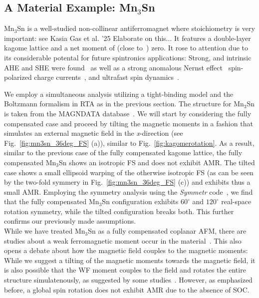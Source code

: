 \documentclass[prb,showpacs,amsmath,amssymb,superscriptaddress,twocolumn,floatfix]{revtex4-1}
\begin{document}
\subsection{A Material Example: Mn$_3$Sn}
\label{sec_I_mat}

Mn$_3$Sn is a well-studied non-collinear antiferromagnet where stoichiometry
is very important: see Kasia Gas et al. '25 %
{\color{red} Elaborate on this...}
It features 
a double-layer kagome lattice and a net moment of (close to~\cite{Tomiyashi:1982}) zero. It rose to attention due to its considerable potental for future spintronics applications: Strong, and intrinsic AHE and SHE were found~\cite{Chen:2021, Manna:2018, Nakatsuji:2015, Zhou:2020, Zhang:2017} as well as a strong anomalous Nernst effect~\cite{Chen:2021, Manna:2018, Zhou:2020} spin-polarized charge currents~\cite{Zelezny:2017}, and ultrafast spin dynamics~\cite{Chen:2021, Nakatsuji:2015}.

We employ a simultaneous analysis utilizing a tight-binding model and the Boltzmann formalism in RTA as in the previous section. The structure for Mn$_3$Sn is taken from the MAGNDATA database~\cite{Magndata:Mn3Sn}. We will start by considering the fully compensated case and proceed by tilting the magnetic moments in a fashion that simulates an external magnetic field in the \textit{x}-direction (see Fig.~\ref{fig:mn3sn_36deg_FS} (a)), similar to Fig.~\ref{fig:kagomerotation}. As a result, similar to the previous case of the fully compensated kagome lattice, the fully compensated Mn$_3$Sn shows an isotropic FS and does not exhibit AMR. The tilted case shows a small ellipsoid warping of the otherwise isotropic FS (as can be seen by the two-fold symmery in Fig.~\ref{fig:mn3sn_36deg_FS} (c)) and exhibits thus a small AMR. Employing the symmetry analysis using the \textit{Symmetr} code~\cite{Symmetr}, we find that the fully compensated Mn$_3$Sn configuration exhibits $60^\circ$ and $120^\circ$ real-space rotation symmetry, while the tilted configuration breaks both. This further confirms our previously made assumptions. \\

While we have treated Mn$_3$Sn as a fully compensated coplanar AFM, there are studies about a weak ferromagnetic moment occur in the material~\cite{Tomiyashi:1982}. This also opens a debate about how the magnetic field couples to the magnetic moments: While we suggest a tilting of the magnetic moments towards the magnetic field, it is also possible that the WF moment couples to the field and rotates the entire structure simulatenously, as suggested by some studies~\cite{Wu:2023}. However, as emphasized before, a global spin rotation does not exhibit AMR due to the absence of SOC. 
\end{document}

